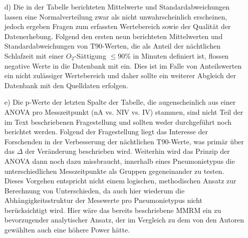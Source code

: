 \documentclass{scrartcl}
\theoremstyle{definition}
\theoremstyle{remark}
\begin{document}
\begin{enumerate}
	\item[d) ]Die in der Tabelle berichteten Mittelwerte und Standardabweichungen lassen eine Normalverteilung zwar als nicht unwahrscheinlich erscheinen, jedoch ergeben Fragen zum erfassten Wertebereich sowie der Qualität der Datenerhebung. Folgend den ersten neun berichteten Mittelwerten und Standardabweichungen von T90-Werten, die als Anteil der nächtlichen Schlafzeit mit einer $O_2$-Sättigung $\le 90\%$ in Minuten definiert ist, flossen negative Werte in die Datenbank mit ein. Dies ist im Falle von Anteilswerten ein nicht zulässiger Wertebereich und daher sollte ein weiterer Abgleich der Datenbank mit den Quelldaten erfolgen.
	\item [e) ]Die p-Werte der letzten Spalte der Tabelle, die augenscheinlich aus einer ANOVA pro Messzeitpunkt (nA vs. NIV vs. IV) stammen, sind nicht Teil der im Text beschriebenen Fragestellung und sollten weder durchgeführt noch berichtet werden. Folgend der Fragestellung liegt das Interesse der Forschenden in der Verbesserung der nächtlichen T90-Werte, was primär über das $\Delta$ der Veränderung beschrieben wird. Weiterhin wird das Prinzip der ANOVA dann noch dazu missbraucht, innerhalb eines Pneumonietypus die unterschiedlichen Messzeitpunkte als Gruppen gegeneinander zu testen. Dieses Vorgehen entspricht nicht einem logischen, methodischen Ansatz zur Berechnung von Unterschieden, da auch hier wiederum die Abhängigkeitsstruktur der Messwerte pro Pneumonietypus nicht berücksichtigt wird. Hier wäre das bereits beschriebene MMRM ein zu bevorzugender analytischer Ansatz, der im Vergleich zu dem von den Autoren gewählten auch eine höhere Power hätte.   
\end{enumerate}
\end{document}
